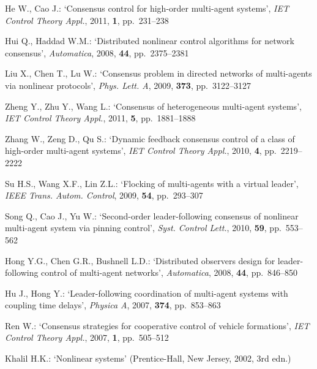 \documentclass{cta-author}
\begin{document}
\begin{thebibliography}{99}
He W., Cao J.: `Consensus control for high-order multi-agent
systems', \textit{IET Control Theory Appl.}, 2011, \textbf{1}, pp.~231--238

Hui Q., Haddad W.M.: `Distributed nonlinear control algorithms
for network consensus', \textit{Automatica}, 2008, \textbf{44}, pp.~2375--2381

Liu X., Chen T., Lu W.: `Consensus problem in directed
networks of multi-agents via nonlinear protocols', \textit{Phys. Lett.
A}, 2009, \textbf{373}, pp.~3122--3127

Zheng Y., Zhu Y., Wang L.: `Consensus of heterogeneous multi-agent systems', \textit{IET Control
Theory Appl.}, 2011, \textbf{5}, pp.~1881--1888

Zhang W., Zeng D., Qu S.: `Dynamic feedback consensus control of a class of high-order multi-agent systems',
\textit{IET Control Theory Appl.}, 2010, \textbf{4}, pp.~2219--2222

Su H.S., Wang X.F., Lin Z.L.: `Flocking of multi-agents with
a virtual leader', \textit{IEEE Trans. Autom. Control}, 2009,
\textbf{54}, pp.~293--307

Song Q., Cao J., Yu W.: `Second-order leader-following
consensus of nonlinear multi-agent system via pinning control', \textit{Syst. Control Lett.}, 2010, \textbf{59}, pp.~553--562

Hong Y.G., Chen G.R., Bushnell L.D.: `Distributed observers
design for leader-following control of multi-agent networks', \textit{Automatica}, 2008, \textbf{44}, pp.~846--850

Hu J., Hong Y.: `Leader-following coordination of multi-agent
systems with coupling time delays', \textit{Physica A}, 2007,
\textbf{374}, pp.~853--863

Ren W.: `Consensus strategies for cooperative control of vehicle
formations', \textit{IET Control Theory Appl.}, 2007, \textbf{1}, pp.~505--512

Khalil H.K.: `Nonlinear systems' (Prentice-Hall, New
Jersey,  2002, 3rd edn.)

\end{thebibliography}
\end{document}
